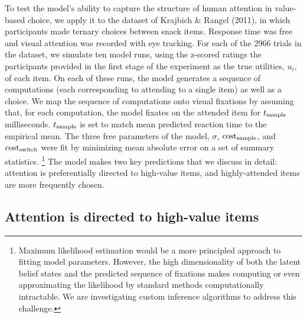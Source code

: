 \documentclass[11pt]{article} %
\begin{document}
To test the model's ability to capture the structure of human attention in value-based choice, we apply it to the dataset of Krajbich \& Rangel (2011), in which participants made ternary choices between snack items. Response time was free and visual attention was recorded with eye tracking. For each of the 2966 trials in the dataset, we simulate ten model runs, using the z-scored ratings the participants provided in the first stage of the experiment as the true utilities, $u_i$, of each item. On each of these runs, the model generates a sequence of computations (each corresponding to attending to a single item) as well as a choice. We map the sequence of computations onto visual fixations by assuming that, for each computation, the model fixates on the attended item for $t_\text{sample}$ milliseconds. $t_\text{sample}$ is set to match mean predicted reaction time to the empirical mean.
The three free parameters of the model, $\sigma$, $\text{cost}_\text{sample}$, and $\text{cost}_\text{switch}$ were fit by minimizing mean absolute error on a set of summary statistics.%
\footnote{Maximum likelihood estimation would be a more principled approach to fitting model parameters. However, the high dimensionality of both the latent belief states and the predicted sequence of fixations makes computing or even approximating the likelihood by standard methods computationally intractable. We are investigating custom inference algorithms to address this challenge.}
The model makes two key predictions that we discuss in detail: attention is preferentially directed to high-value items, and highly-attended items are more frequently chosen.

\subsection{Attention is directed to high-value items}
\end{document}
